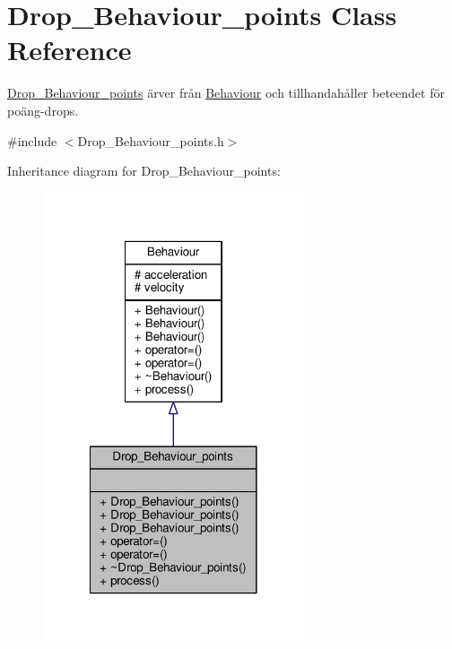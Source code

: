 \hypertarget{classDrop__Behaviour__points}{\section{Drop\+\_\+\+Behaviour\+\_\+points Class Reference}
\label{classDrop__Behaviour__points}
}


\hyperlink{classDrop__Behaviour__points}{Drop\+\_\+\+Behaviour\+\_\+points} ärver från \hyperlink{classBehaviour}{Behaviour} och tillhandahåller beteendet för poäng-\/drops.  




{\ttfamily \#include $<$Drop\+\_\+\+Behaviour\+\_\+points.\+h$>$}



Inheritance diagram for Drop\+\_\+\+Behaviour\+\_\+points\+:\nopagebreak
\begin{figure}[H]
\begin{center}
\leavevmode
\includegraphics[width=218pt]{classDrop__Behaviour__points__inherit__graph}
\end{center}
\end{figure}



